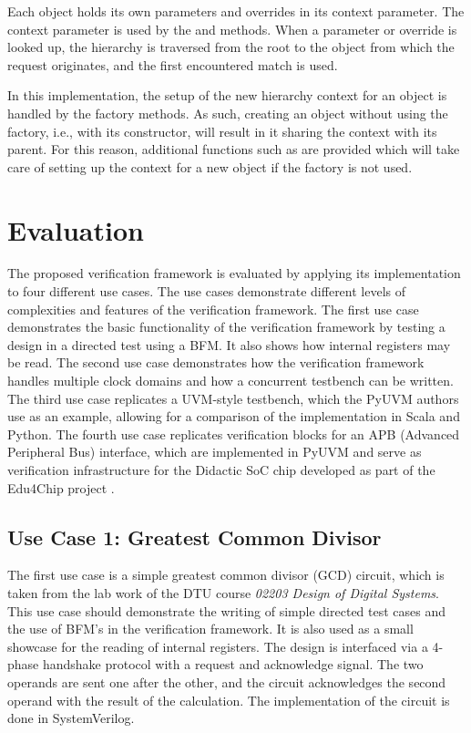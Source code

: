 Each object holds its own parameters and overrides in its  context parameter. The context parameter is used by the  and  methods. When a parameter or override is looked up, the hierarchy is traversed from the root to the object from which the request originates, and the first encountered match is used. 

In this implementation, the setup of the new hierarchy context for an object is handled by the factory methods. As such, creating an object without using the factory, i.e., with its constructor, will result in it sharing the context with its parent. For this reason, additional functions such as  are provided which will take care of setting up the context for a new object if the factory is not used.



\chapter{Evaluation}

The proposed verification framework is evaluated by applying its implementation to four different use cases. The use
cases demonstrate different levels of complexities and features of the verification framework. The first use case
demonstrates the basic functionality of the verification framework by testing a design in a directed test using a
BFM. It also shows how internal registers may be read. The second use case demonstrates how the verification
framework handles multiple clock domains and how a concurrent testbench can be written. The third use case replicates
a UVM-style testbench, which the PyUVM authors use as an example, allowing for a comparison of the implementation in
Scala and Python. The fourth use case replicates verification blocks for an APB (Advanced Peripheral Bus) interface, which are implemented in
PyUVM and serve as verification infrastructure for the Didactic SoC chip developed as part of the
Edu4Chip project \cite{edu4chip}. 

\section{Use Case 1: Greatest Common Divisor} %

The first use case is a simple greatest common divisor (GCD) circuit, which is taken from the lab work of the DTU
course \textit{02203 Design of Digital Systems}. This use case should demonstrate the writing of simple directed test
cases and the use of BFM's in the verification framework. It is also used as a small showcase for the reading of
internal registers. The design is interfaced via a 4-phase handshake protocol with a request and acknowledge signal.
The two operands are sent one after the other, and the circuit acknowledges the second operand with the result of the
calculation. The implementation of the circuit is done in SystemVerilog.

